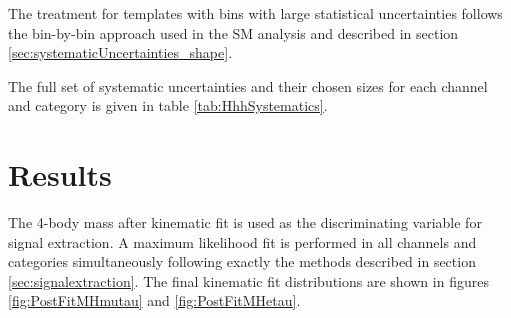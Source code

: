 The treatment for templates with bins with large statistical uncertainties
follows the bin-by-bin approach used in the \ac{SM} analysis and described in
section \ref{sec:systematicUncertainties_shape}. 

The full set of systematic
uncertainties and their chosen sizes for each channel and category is given in
table \ref{tab:HhhSystematics}.



\section{Results}
\label{sec:Hhhresults}

The 4-body mass after kinematic fit is used as the discriminating variable for
signal extraction. A maximum likelihood fit is performed in all channels and
categories simultaneously following exactly the methods described in section
\ref{sec:signalextraction}. The final kinematic fit distributions are shown in
figures \ref{fig:PostFitMHmutau} and \ref{fig:PostFitMHetau}.

